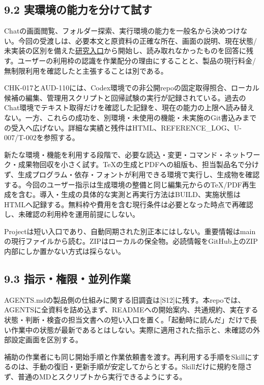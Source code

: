 \documentclass[11pt,a4paper]{article}
\begin{document}
\subsection{9.2
実環境の能力を分けて試す}\label{ux5b9fux74b0ux5883ux306eux80fdux529bux3092ux5206ux3051ux3066ux8a66ux3059}

Chatの画面閲覧、フォルダー探索、実行環境の能力を一般名から決めつけない。今回の受渡しは、必要本文と原資料の正確な所在、画面の説明、現在状態/未実装の区別を備えた\href{research/README.md}{研究入口}から開始し、読み取れなかったものを回答に残す。ユーザーの利用枠の認識を作業配分の理由にすることと、製品の現行料金/無制限利用を確認したと主張することは別である。

CHK-017とAUD-110には、Codex環境での非公開repoの固定取得照合、ローカル候補の編集、管理用スクリプトと回帰試験の実行が記録されている。過去のChat環境でテキスト取得だけを確認した記録を、現在の能力の上限へ読み替えない。一方、これらの成功を、別環境・未使用の機能・未実施のGit書込みまでの受入へ広げない。詳細な実績と残件はHTML、REFERENCE\_LOG、U-007/T-002を参照する。

新たな環境・機能を利用する段階で、必要な読込・変更・コマンド・ネットワーク・成果物回収を小さく試す。TeXの生成とPDFへの組版も、担当製品名で分けず、生成プログラム・依存・フォントが利用できる環境で実行し、生成物を確認する。今回のユーザー指示は生成環境の整備と同じ編集元からのTeX/PDF再生成を含む。導入・生成の具体的な実測と再実行方法はBUILD、実施状態はHTMLへ記録する。無料枠や費用を含む現行条件は必要となった時点で再確認し、未確認の利用枠を運用前提にしない。

Projectは短い入口であり、自動同期された別正本にはしない。重要情報はmainの現行ファイルから読む。ZIPはローカルの保全物。必読情報をGitHub上のZIP内部にしか置かない方式は採らない。

\subsection{9.3
指示・権限・並列作業}\label{ux6307ux793aux6a29ux9650ux4e26ux5217ux4f5cux696d}

AGENTS.mdの製品側の仕組みに関する旧調査は{[}S12{]}に残す。本repoでは、AGENTSに全資料を詰め込まず、READMEへの開始案内、共通規約、実在する状態・判断・検査の担当文書への短い入口を置く。「起動時に読んだ」だけで長い作業中の状態が最新であるとはしない。実際に適用された指示と、未確認の外部設定画面を区別する。

補助の作業者にも同じ開始手順と作業依頼書を渡す。再利用する手順をSkillにするのは、手動の復旧・更新手順が安定してからとする。Skillだけに規約を隠さず、普通のMDとスクリプトから実行できるようにする。
\end{document}
